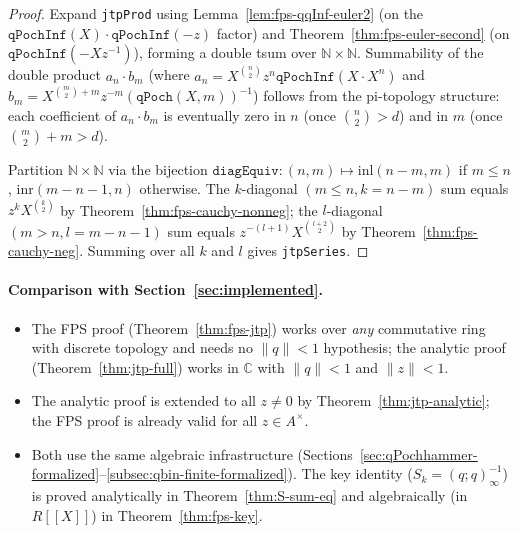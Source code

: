 \begin{proof}\leanok{}
Expand \texttt{jtpProd} using Lemma~\ref{lem:fps-qqInf-euler2} (on the
$\texttt{qPochInf}(X)\cdot\texttt{qPochInf}(-z)$ factor) and
Theorem~\ref{thm:fps-euler-second} (on $\texttt{qPochInf}(-X z^{-1})$), forming a
double tsum over $\mathbb{N}\times\mathbb{N}$. Summability of the double product
$a_n \cdot b_m$ (where $a_n = X^{\binom{n}{2}} z^n \texttt{qPochInf}(X\cdot X^n)$ and
$b_m = X^{\binom{m}{2}+m} z^{-m} (\texttt{qPoch}(X,m))^{-1}$) follows from the
pi-topology structure: each coefficient of $a_n \cdot b_m$ is eventually zero
in $n$ (once $\binom{n}{2} > d$) and in $m$ (once $\binom{m}{2}+m > d$).

Partition $\mathbb{N}\times\mathbb{N}$ via the bijection
$\mathtt{diagEquiv} : (n,m) \mapsto \text{inl}(n-m,m)$ if $m \le n$,
$\text{inr}(m-n-1,n)$ otherwise. The $k$-diagonal $(m \le n, k = n-m)$
sum equals $z^k X^{\binom{k}{2}}$ by Theorem~\ref{thm:fps-cauchy-nonneg};
the $l$-diagonal $(m > n, l = m-n-1)$ sum equals $z^{-(l+1)} X^{\binom{l+2}{2}}$
by Theorem~\ref{thm:fps-cauchy-neg}. Summing over all $k$ and $l$
gives \texttt{jtpSeries}.
\end{proof}

\paragraph{Comparison with Section~\ref{sec:implemented}.}
\begin{itemize}
\item The FPS proof (Theorem~\ref{thm:fps-jtp}) works over \emph{any} commutative
ring with discrete topology and needs no $\|q\|<1$ hypothesis; the analytic proof
(Theorem~\ref{thm:jtp-full}) works in $\mathbb{C}$ with $\|q\| < 1$ and $\|z\| < 1$.
\item The analytic proof is extended to all $z\neq 0$ by
Theorem~\ref{thm:jtp-analytic}; the FPS proof is already valid for all
$z \in A^\times$.
\item Both use the same algebraic infrastructure
(Sections~\ref{sec:qPochhammer-formalized}--\ref{subsec:qbin-finite-formalized}).
The key identity ($S_k = (q;q)_\infty^{-1}$) is proved analytically in
Theorem~\ref{thm:S-sum-eq} and algebraically (in $R[\![ X]\!]$) in
Theorem~\ref{thm:fps-key}.
\end{itemize}
